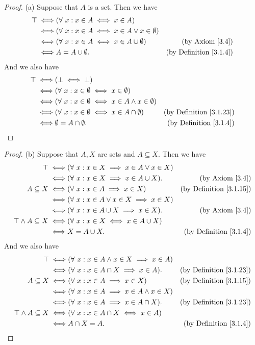 \begin{proof}{(a)}
Suppose that \(A\) is a set.
Then we have
\begin{align*}
\top \iff & (\forall\ x : x \in A \iff x \in A) \\
\iff & (\forall\ x : x \in A \iff x \in A \lor x \in \emptyset) \\
\iff & (\forall\ x : x \in A \iff x \in A \cup \emptyset) & \text{(by Axiom \ref{3.4})} \\
\iff & A = A \cup \emptyset. & \text{(by Definition \ref{3.1.4})}
\end{align*}
And we also have
\begin{align*}
\top \iff & (\bot \iff \bot) \\
\iff & (\forall\ x : x \in \emptyset \iff x \in \emptyset) \\
\iff & (\forall\ x : x \in \emptyset \iff x \in A \land x \in \emptyset) \\
\iff & (\forall\ x : x \in \emptyset \iff x \in A \cap \emptyset) & \text{(by Definition \ref{3.1.23})} \\
\iff & \emptyset = A \cap \emptyset. & \text{(by Definition \ref{3.1.4})}
\end{align*}
\end{proof}

\begin{proof}{(b)}
Suppose that \(A, X\) are sets and \(A \subseteq X\).
Then we have
\begin{align*}
\top \iff & (\forall\ x : x \in X \implies x \in A \lor x \in X) \\
\iff & (\forall\ x : x \in X \implies x \in A \cup X). & \text{(by Axiom \ref{3.4})} \\
A \subseteq X \iff & (\forall\ x : x \in A \implies x \in X) & \text{(by Definition \ref{3.1.15})} \\
\iff & (\forall\ x : x \in A \lor x \in X \implies x \in X) \\
\iff & (\forall\ x : x \in A \cup X \implies x \in X). & \text{(by Axiom \ref{3.4})} \\
\top \land A \subseteq X \iff & (\forall\ x : x \in X \iff x \in A \cup X) \\
\iff & X = A \cup X. & \text{(by Definition \ref{3.1.4})}
\end{align*}
And we also have
\begin{align*}
\top \iff & (\forall\ x : x \in A \land x \in X \implies x \in A) \\
\iff & (\forall\ x : x \in A \cap X \implies x \in A). & \text{(by Definition \ref{3.1.23})} \\
A \subseteq X \iff & (\forall\ x : x \in A \implies x \in X) & \text{(by Definition \ref{3.1.15})} \\
\iff & (\forall\ x : x \in A \implies x \in A \land x \in X) \\
\iff & (\forall\ x : x \in A \implies x \in A \cap X). & \text{(by Definition \ref{3.1.23})} \\
\top \land A \subseteq X \iff & (\forall\ x : x \in A \cap X \iff x \in A) \\
\iff & A \cap X = A. & \text{(by Definition \ref{3.1.4})}
\end{align*}
\end{proof}


